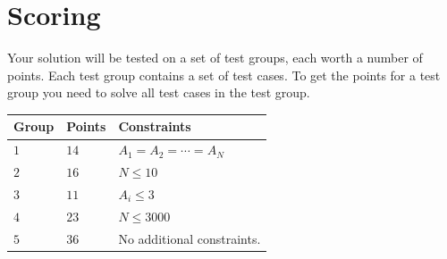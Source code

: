 \section*{Scoring}
Your solution will be tested on a set of test groups, each worth a number of points. Each test group contains
a set of test cases. To get the points for a test group you need to solve all test cases in the test group.

\noindent
\begin{tabular}{| l | l | l |}
  \hline
  \textbf{Group} & \textbf{Points} & \textbf{Constraints} \\ \hline
  $1$   & $14$       & $A_1 = A_2 = \cdots = A_N$\\ \hline
  $2$   & $16$       & $N \leq 10$  \\ \hline
  $3$   & $11$       & $A_i \leq 3$ \\ \hline
  $4$   & $23$       & $N \leq 3000$ \\ \hline
  $5$   & $36$       & No additional constraints. \\ \hline
\end{tabular}


